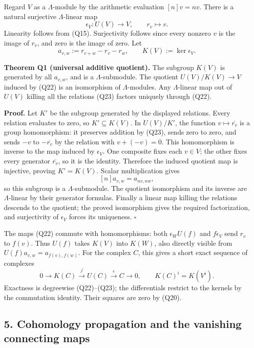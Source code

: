 \documentclass[
]{article}
\begin{document}
Regard \(V\) as a \(\Lambda\)-module by the arithmetic evaluation
\([n]v=nv\). There is a natural surjective \(\Lambda\)-linear map \[
\epsilon_V:U(V)\to V,\qquad r_v\longmapsto v.
\tag{Q22}
\] Linearity follows from (Q15). Surjectivity follows since every
nonzero \(v\) is the image of \(r_v\), and zero is the image of zero.
Let \[
a_{v,w}:=r_{v+w}-r_v-r_w,
\qquad K(V):=\ker\epsilon_V.
\tag{Q23}
\]

\textbf{Theorem Q1 (universal additive quotient).} The subgroup \(K(V)\)
is generated by all \(a_{v,w}\), and is a \(\Lambda\)-submodule. The
quotient \(U(V)/K(V)\to V\) induced by (Q22) is an isomorphism of
\(\Lambda\)-modules. Any \(\Lambda\)-linear map out of \(U(V)\) killing
all the relations (Q23) factors uniquely through (Q22).

\textbf{Proof.} Let \(K'\) be the subgroup generated by the displayed
relations. Every relation evaluates to zero, so \(K'\subseteq K(V)\). In
\(U(V)/K'\), the function \(v\mapsto\overline{r_v}\) is a group
homomorphism: it preserves addition by (Q23), sends zero to zero, and
sends \(-v\) to \(-\overline{r_v}\) by the relation with \(v+(-v)=0\).
This homomorphism is inverse to the map induced by \(\epsilon_V\). One
composite fixes each \(v\in V\); the other fixes every generator
\(\overline{r_v}\), so it is the identity. Therefore the induced
quotient map is injective, proving \(K'=K(V)\). Scalar multiplication
gives \[
[n]a_{v,w}=a_{nv,nw},
\tag{Q24}
\] so this subgroup is a \(\Lambda\)-submodule. The quotient isomorphism
and its inverse are \(\Lambda\)-linear by their generator formulas.
Finally a linear map killing the relations descends to the quotient; the
proved isomorphism gives the required factorization, and surjectivity of
\(\epsilon_V\) forces its uniqueness. \(\square\)

The maps (Q22) commute with homomorphisms: both \(\epsilon_W U(f)\) and
\(f\epsilon_V\) send \(r_v\) to \(f(v)\). Thus \(U(f)\) takes \(K(V)\)
into \(K(W)\), also directly visible from \(U(f)a_{v,w}=a_{f(v),f(w)}\).
For the complex \(C\), this gives a short exact sequence of complexes \[
0\longrightarrow K(C)\xrightarrow{j}U(C)
\xrightarrow{\epsilon}C\longrightarrow0,
\qquad K(C)^i=K(V^i).
\tag{Q25}
\] Exactness is degreewise (Q22)--(Q23); the differentials restrict to
the kernels by the commutation identity. Their squares are zero by
(Q20).

\subsection{5. Cohomology propagation and the vanishing connecting
maps}\label{cohomology-propagation-and-the-vanishing-connecting-maps}
\end{document}
